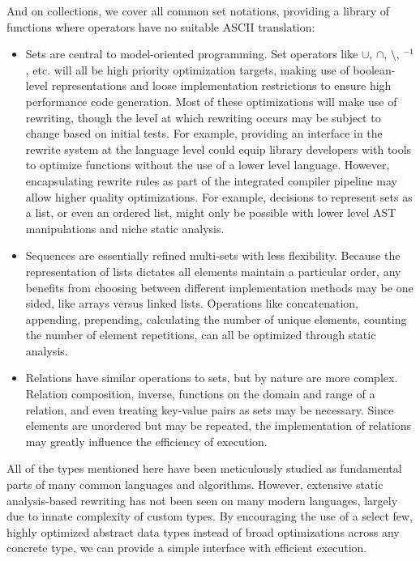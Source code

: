 \documentclass{article}
\begin{document}
And on collections, we cover all common set notations, providing a library of functions where operators have no suitable ASCII translation:
\begin{itemize}
  \item Sets are central to model-oriented programming. Set operators like $\cup$, $\cap$, $\setminus$, $^{-1}$, etc. will all be high priority optimization targets, making use of boolean-level representations and loose implementation restrictions to ensure high performance code generation. Most of these optimizations will make use of rewriting, though the level at which rewriting occurs may be subject to change based on initial tests. For example, providing an interface in the rewrite system at the language level could equip library developers with tools to optimize functions without the use of a lower level language. However, encapsulating rewrite rules as part of the integrated compiler pipeline may allow higher quality optimizations. For example, decisions to represent sets as a list, or even an ordered list, might only be possible with lower level AST manipulations and niche static analysis.
  \item Sequences are essentially refined multi-sets with less flexibility. Because the representation of lists dictates all elements maintain a particular order, any benefits from choosing between different implementation methods may be one sided, like arrays versus linked lists. Operations like concatenation, appending, prepending, calculating the number of unique elements, counting the number of element repetitions, can all be optimized through static analysis.
  \item Relations have similar operations to sets, but by nature are more complex. Relation composition, inverse, functions on the domain and range of a relation, and even treating key-value pairs as sets may be necessary. Since elements are unordered but may be repeated, the implementation of relations may greatly influence the efficiency of execution.
\end{itemize}

All of the types mentioned here have been meticulously studied as fundamental parts of many common languages and algorithms. However, extensive static analysis-based rewriting has not been seen on many modern languages, largely due to innate complexity of custom types. By encouraging the use of a select few, highly optimized abstract data types instead of broad optimizations across any concrete type, we can provide a simple interface with efficient execution.
\end{document}
